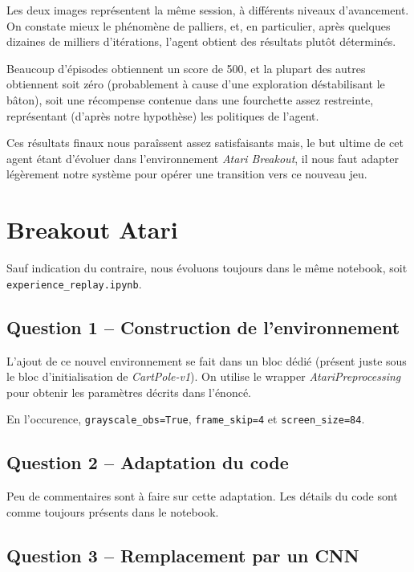 \documentclass[12pt,french]{article}
\begin{document}
Les deux images représentent la même session, à différents niveaux d'avancement. On constate mieux le phénomène de palliers, et, en particulier, après quelques dizaines de milliers d'itérations, l'agent obtient des résultats plutôt déterminés.

Beaucoup d'épisodes obtiennent un score de 500, et la plupart des autres obtiennent soit zéro (probablement à cause d'une exploration déstabilisant le bâton), soit une récompense contenue dans une fourchette assez restreinte, représentant (d'après notre hypothèse) les politiques de l'agent.

Ces résultats finaux nous paraîssent assez satisfaisants mais, le but ultime de cet agent étant d'évoluer dans l'environnement \textit{Atari Breakout}, il nous faut adapter légèrement notre système pour opérer une transition vers ce nouveau jeu.

\section{Breakout Atari}

Sauf indication du contraire, nous évoluons toujours dans le même notebook, soit \texttt{experience\_replay.ipynb}.

\subsection{Question 1 -- Construction de l'environnement}\label{preproc}

L'ajout de ce nouvel environnement se fait dans un bloc dédié (présent juste sous le bloc d'initialisation de \textit{CartPole-v1}). On utilise le wrapper \textit{AtariPreprocessing} pour obtenir les paramètres décrits dans l'énoncé.

En l'occurence, \texttt{grayscale\_obs=True}, \texttt{frame\_skip=4} et \texttt{screen\_size=84}.

\subsection{Question 2 -- Adaptation du code}

Peu de commentaires sont à faire sur cette adaptation. Les détails du code sont comme toujours présents dans le notebook.

\subsection{Question 3 -- Remplacement par un CNN}\label{cnn}
\end{document}
